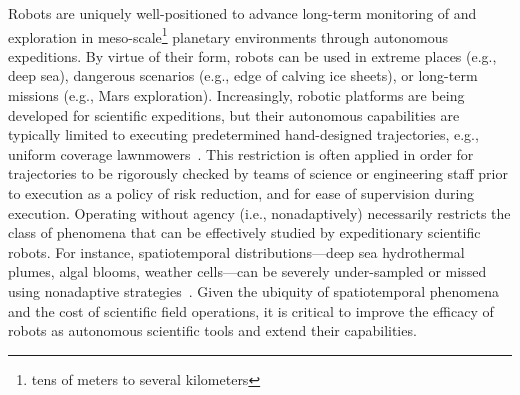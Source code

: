 Robots are uniquely well-positioned to advance long-term monitoring of and exploration in meso-scale\footnote{tens of meters to several kilometers} planetary environments through autonomous expeditions.
By virtue of their form, robots can be used in extreme places (e.g., deep sea), dangerous scenarios (e.g., edge of calving ice sheets), or long-term missions (e.g., Mars exploration). Increasingly, robotic platforms are being developed for scientific expeditions, but their autonomous capabilities are typically limited to executing predetermined hand-designed trajectories, e.g., uniform coverage lawnmowers~\autocite{camilli2010tracking}.
This restriction is often applied in order for trajectories to be rigorously checked by teams of science or engineering staff prior to execution as a policy of risk reduction, and for ease of supervision during execution.
Operating without agency (i.e., nonadaptively) necessarily restricts the class of phenomena that can be effectively studied by expeditionary scientific robots.
For instance, spatiotemporal distributions---deep sea hydrothermal plumes, algal blooms, weather cells---can be severely under-sampled or missed using nonadaptive strategies~\autocite{flaspohler2019information}.
Given the ubiquity of spatiotemporal phenomena and the cost of scientific field operations, it is critical to improve the efficacy of robots as autonomous scientific tools and extend their capabilities.

